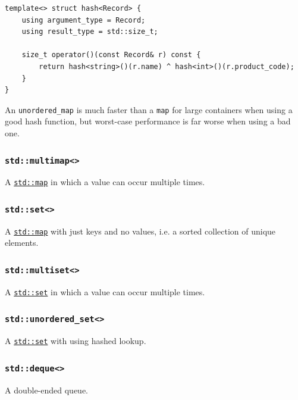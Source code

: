 \documentclass[table, xcdraw]{article}%
\begin{document}
\begin{verbatim}
template<> struct hash<Record> {
    using argument_type = Record;
    using result_type = std::size_t;
    
    size_t operator()(const Record& r) const {
        return hash<string>()(r.name) ^ hash<int>()(r.product_code);
    }
}
\end{verbatim}

An \texttt{unordered_map} is much faster than a \texttt{map} for large containers when using a good hash function, but worst-case performance is far worse when using a bad one.

\subsubsection{\texttt{std::multimap<>}} \label{std_multimap}

A \hyperref[std_map]{\texttt{std::map}} in which a value can occur multiple times.

\subsubsection{\texttt{std::set<>}} \label{std_set}

A \hyperref[std_map]{\texttt{std::map}} with just keys and no values, i.e. a sorted collection of unique elements.

\subsubsection{\texttt{std::multiset<>}} \label{std_multiset}

A \hyperref[std_set]{\texttt{std::set}} in which a value can occur multiple times.

\subsubsection{\texttt{std::unordered_set<>}} \label{std_unordered_set}

A \hyperref[std_set]{\texttt{std::set}} with using hashed lookup.

\subsubsection{\texttt{std::deque<>}} \label{std_deque}

A double-ended queue.
\end{document}
